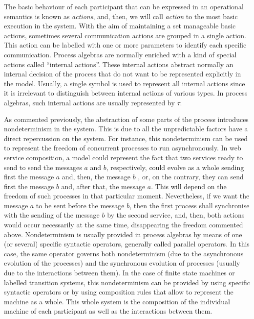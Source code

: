 The basic behaviour of each participant that can be expressed in an operational semantics
is known as \emph{actions}, and, then, we will call \emph{action}  to the most
basic execution in the system. With the aim of maintaining a set
manageable basic actions, sometimes several communication actions are grouped
in a single action. This action can be 
labelled with one or more parameters to
identify each specific communication. Process algebras are normally enriched
with a kind of special actions called ``internal actions''. These
internal actions abstract normally an internal decision of the process that 
do not want to be represented explicitly in the model. Usually, a single symbol is used to represent 
all internal actions since it is irrelevant to distinguish between internal actions
of various types. In process algebras, such
internal actions are usually represented by $\tau$.


As commented previously, the abstraction of some parts of the process introduces nondeterminism in the system.
This is due to all the unpredictable factors have a direct repercussion on the
system. For instance, this nondeterminism can be used to represent the freedom of concurrent processes
to run asynchronously. In web service composition, a model could represent the fact
that two services ready to send to send the messages $a$ and $b$, respectively, could
evolve as a whole sending first the message $a$ and, then, the message $b$ , or, on the contrary, they can send first the message $b$
and, after that, the message $a$. This will depend on the
freedom of such processes in that particular moment. Nevertheless, 
if we want the message $a$ to be sent before the message $b$, then the first process shall synchronise with
the sending of the message $b$ by the second service, and, then, both actions would occur
necessarily at the same time, disappearing the freedom commented above. 
Nondeterminism is usually provided in process algebras by means of
one (or several) specific syntactic operators, generally called parallel operators. 
In this case, the same operator governs both nondeterminism (due to the asynchronous evolution
of the processes) and the synchronous evolution of processes (usually due to the interactions between them).
In the case of finite state machines or labelled
transition systems, this nondeterminism can be provided by using specific syntactic operators
or by using composition rules that allow to represent the machine as a whole. This whole system is the composition
of the individual machine of each participant as well as the interactions between them.


